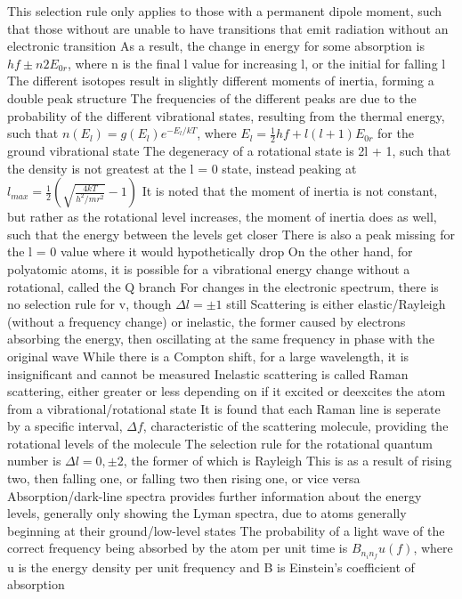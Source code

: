 \documentclass[11 pt, twoside]{article}
\newenvironment{outline*}
{
	\begin{outline}[enumerate]
	}
	{\end{outline}
}
\begin{document}
\begin{outline*}
		\3 This selection rule only applies to those with a permanent dipole moment, such that those without are unable to have transitions that emit radiation without an electronic transition
		\3 As a result, the change in energy for some absorption is $hf \pm n2E_{0r}$, where n is the final l value for increasing l, or the initial for falling l
		\3 The different isotopes result in slightly different moments of inertia, forming a double peak structure
		\3 The frequencies of the different peaks are due to the probability of the different vibrational states, resulting from the thermal energy, such that $n(E_l) = g(E_l)e^{-E_l/kT}$, where $E_l = \frac{1}{2}hf + l(l+1)E_{0r}$ for the ground vibrational state
			\4 The degeneracy of a rotational state is 2l + 1, such that the density is not greatest at the l = 0 state, instead peaking at $l_{max} = \frac{1}{2}(\sqrt{\frac{4kT}{h^2/mr^2}} - 1)$
		\3 It is noted that the moment of inertia is not constant, but rather as the rotational level increases, the moment of inertia does as well, such that the energy between the levels get closer
			\4 There is also a peak missing for the l = 0 value where it would hypothetically drop
			\4 On the other hand, for polyatomic atoms, it is possible for a vibrational energy change without a rotational, called the Q branch
		\3 For changes in the electronic spectrum, there is no selection rule for v, though $\Delta l = \pm 1$ still
\1 Scattering is either elastic/Rayleigh (without a frequency change) or inelastic, the former caused by electrons absorbing the energy, then oscillating at the same frequency in phase with the original wave
	\2 While there is a Compton shift, for a large wavelength, it is insignificant and cannot be measured
	\2 Inelastic scattering is called Raman scattering, either greater or less depending on if it excited or deexcites the atom from a vibrational/rotational state
		\3 It is found that each Raman line is seperate by a specific interval, $\Delta f$, characteristic of the scattering molecule, providing the rotational levels of the molecule
		\3 The selection rule for the rotational quantum number is $\Delta l = 0, \pm 2$, the former of which is Rayleigh
			\4 This is as a result of rising two, then falling one, or falling two then rising one, or vice versa
	\2 Absorption/dark-line spectra provides further information about the energy levels, generally only showing the Lyman spectra, due to atoms generally beginning at their ground/low-level states
		\3 The probability of a light wave of the correct frequency being absorbed by the atom per unit time is $B_{n_in_f}u(f)$, where u is the energy density per unit frequency and B is Einstein's coefficient of absorption

\end{outline*}
\end{document}
